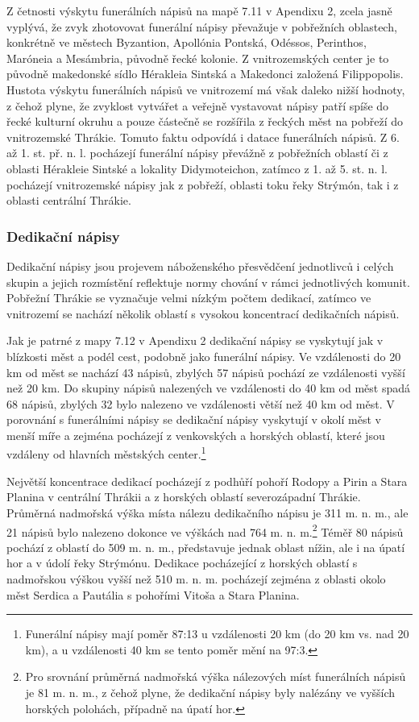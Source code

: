Z četnosti výskytu funerálních nápisů na mapě 7.11 v Apendixu 2, zcela jasně vyplývá, že zvyk zhotovovat funerální nápisy převažuje v pobřežních oblastech, konkrétně ve městech Byzantion, Apollónia Pontská, Odéssos, Perinthos, Maróneia a Mesámbria, původně řecké kolonie. Z vnitrozemských center je to původně makedonské sídlo Hérakleia Sintská a Makedonci založená Filippopolis. Hustota výskytu funerálních nápisů ve vnitrozemí má však daleko nižší hodnoty, z čehož plyne, že zvyklost vytvářet a veřejně vystavovat nápisy patří spíše do řecké kulturní okruhu a pouze částečně se rozšířila z řeckých měst na pobřeží do vnitrozemské Thrákie. Tomuto faktu odpovídá i datace funerálních nápisů. Z 6. až 1. st. př. n. l. pocházejí funerální nápisy převážně z pobřežních oblastí či z oblasti Hérakleie Sintské a lokality Didymoteichon, zatímco z 1. až 5. st. n. l. pocházejí vnitrozemské nápisy jak z pobřeží, oblasti toku řeky Strýmón, tak i z oblasti centrální Thrákie.

\subsubsection[dedikační-nápisy-19]{Dedikační nápisy}

Dedikační nápisy jsou projevem náboženského přesvědčení jednotlivců i celých skupin a jejich rozmístění reflektuje normy chování v rámci jednotlivých komunit. Pobřežní Thrákie se vyznačuje velmi nízkým počtem dedikací, zatímco ve vnitrozemí se nachází několik oblastí s vysokou koncentrací dedikačních nápisů.

Jak je patrné z mapy 7.12 v Apendixu 2 dedikační nápisy se vyskytují jak v blízkosti měst a podél cest, podobně jako funerální nápisy. Ve vzdálenosti do 20 km od měst se nachází 43  nápisů, zbylých 57  nápisů pochází ze vzdálenosti vyšší než 20 km. Do skupiny nápisů nalezených ve vzdálenosti do 40 km od měst spadá 68  nápisů, zbylých 32  bylo nalezeno ve vzdálenosti větší než 40 km od měst. V porovnání s funerálními nápisy se dedikační nápisy vyskytují v okolí měst v menší míře a zejména pocházejí z venkovských a horských oblastí, které jsou vzdáleny od hlavních městských center.\footnote{Funerální nápisy mají poměr 87:13 u vzdálenosti 20 km (do 20 km vs. nad 20 km), a u vzdálenosti 40 km se tento poměr mění na 97:3.}

Největší koncentrace dedikací pocházejí z podhůří pohoří Rodopy a Pirin a Stara Planina v centrální Thrákii a z horských oblastí severozápadní Thrákie. Průměrná nadmořská výška místa nálezu dedikačního nápisu je 311 m. n. m., ale 21 nápisů bylo nalezeno dokonce ve výškách nad 764 m. n. m.\footnote{Pro srovnání průměrná nadmořská výška nálezových míst funerálních nápisů je 81 m. n. m., z čehož plyne, že dedikační nápisy byly nalézány ve vyšších horských polohách, případně na úpatí hor.} Téměř 80  nápisů pochází z oblastí do 509 m. n. m., představuje jednak oblast nížin, ale i na úpatí hor a v údolí řeky Strýmónu. Dedikace pocházející z horských oblastí s nadmořskou výškou vyšší než 510 m. n. m. pocházejí zejména z oblasti okolo měst Serdica a Pautália s pohořími Vitoša a Stara Planina.

